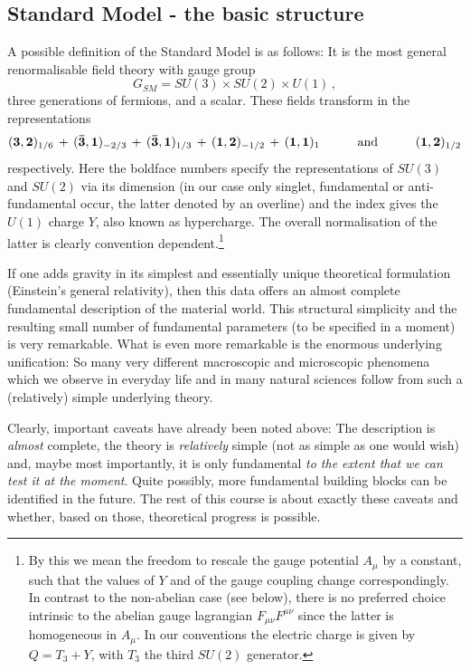 \documentclass[12pt]{article}
\newcommand{\be}{\begin{equation}}
\newcommand{\ee}{\end{equation}}
\numberwithin{equation}{section}
\begin{document}
\subsection{Standard Model - the basic structure}
A possible definition of the Standard Model  is as follows: It is the most general renormalisable field theory with gauge group
\be
G_{SM}= SU(3)\times SU(2)\times U(1)\,,\label{gro}
\ee
three generations of fermions, and a scalar. These fields transform in the representations 
\be
({\bf 3},{\bf
2})_{1/6}\,+\,({\bf {\bar 3}},{\bf 1})_{-2/3}\,+\, ({\bf {\bar
3}},{\bf 1})_{1/3}\,+\,({\bf 1},{\bf 2})_{-1/2}\,+\, ({\bf 1},{\bf
1})_{1}\qquad\quad\mbox{and}\qquad\quad ({\bf 1},{\bf 2})_{1/2}\label{mat}
\ee
respectively. Here the boldface numbers specify the representations of $SU(3)$ and $SU(2)$ via its dimension (in our case only singlet, fundamental or anti-fundamental occur, the latter denoted by an overline) and the index gives the $U(1)$ charge $Y$, also known as  hypercharge. The overall normalisation of the latter is clearly convention dependent.\footnote{
By this we mean the freedom to rescale the gauge potential $A_\mu$ by a constant, such that the values of $Y$ and of the gauge coupling change correspondingly. In contrast to the non-abelian case (see below), there is no preferred choice intrinsic to the abelian gauge lagrangian $F_{\mu\nu}F^{\mu\nu}$ since the latter is homogeneous in $A_\mu$. In our conventions the electric charge is given by $Q=T_3+Y$, with $T_3$ the third $SU(2)$ generator.
}

If one adds gravity in its simplest and essentially unique theoretical formulation (Einstein's general relativity), then this data offers an almost complete fundamental description of the material world. This structural simplicity and the resulting small number of fundamental parameters (to be specified in a moment) is very remarkable. What is even more remarkable is the enormous underlying unification: So many very different macroscopic and microscopic phenomena which we observe in everyday life and in many natural sciences follow from such a (relatively) simple underlying theory.

Clearly, important caveats have already been noted above: The description is {\it almost} complete, the theory is {\it relatively} simple (not as simple as one would wish) and, maybe most importantly, it is only fundamental {\it to the extent that we can test it at the moment}. Quite possibly, more fundamental building blocks can be identified in the future. The rest of this course is about exactly these caveats and whether, based on those, theoretical progress is possible. 
\end{document}
